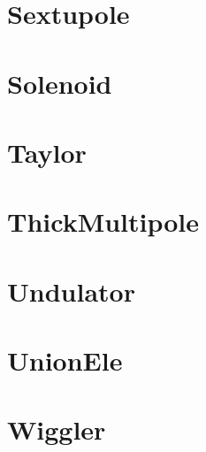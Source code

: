 \section{Sextupole}
\label{s:sextupole}


\section{Solenoid}
\label{s:solenoid}


\section{Taylor}
\label{s:taylor}


\section{ThickMultipole}
\label{s:thickmult}


\section{Undulator}
\label{s:undulator}


\section{UnionEle}
\label{s:unionele}


\section{Wiggler}
\label{s:wiggler}


